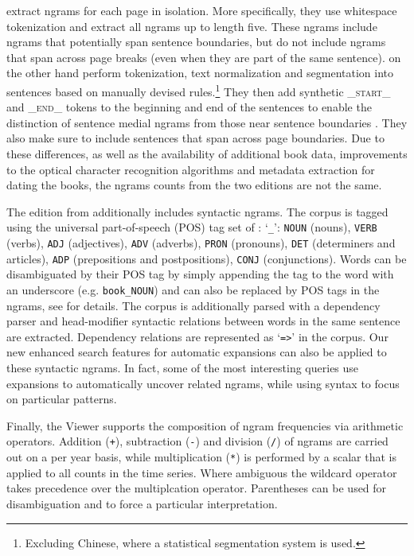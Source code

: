 \documentclass[11pt,a4paper]{article}
\newcommand{\query}[1]{\texttt{#1}}
\begin{document}
 extract ngrams for each page in isolation. More specifically, they use whitespace tokenization and extract all ngrams up to length five. These ngrams include ngrams that potentially span sentence boundaries, but do not include ngrams that span across page breaks (even when they are part of the same sentence).
 on the other hand perform tokenization, text normalization and segmentation into sentences based on manually devised rules.\footnote{Excluding Chinese, where a statistical segmentation system is used.} They then add synthetic \textsf{\textsc{\_start\_}} and \textsf{\textsc{\_end\_}} tokens to the beginning and end of the sentences to enable the distinction of sentence medial ngrams from those near sentence boundaries \cite{lin2012syntactic}. They also make sure to include sentences that span across page boundaries. Due to these differences, as well as the availability of additional book data, improvements to the optical character recognition algorithms and metadata extraction for dating the books, the ngrams counts from the two editions are not the same.

The edition from  additionally includes syntactic ngrams. The corpus is tagged using the universal part-of-speech (POS) tag set of : `\query{\_}': \query{NOUN} (nouns), \query{VERB} (verbs), \query{ADJ} (adjectives), \query{ADV} (adverbs), \query{PRON} (pronouns), \query{DET} (determiners and articles), \query{ADP} (prepositions and postpositions), \query{CONJ} (conjunctions). Words can be disambiguated by their POS tag by simply appending the tag to the word with an underscore (e.g. \texttt{book\_NOUN}) and can also be replaced by POS tags in the ngrams, see  for details. The corpus is additionally parsed with a dependency parser and head-modifier syntactic relations between words in the same sentence are extracted. Dependency relations are represented as `\query{=>}' in the corpus. Our new enhanced search features for automatic expansions can also be applied to these syntactic ngrams. In fact, some of the most interesting queries use expansions to automatically uncover related ngrams, while using syntax to focus on particular patterns.

Finally, the Viewer supports the composition of ngram frequencies via arithmetic operators. Addition (\query{+}), subtraction (\query{-}) and division (\query{/}) of ngrams are carried out on a per year basis, while multiplication (\query{*}) is performed by a scalar that is applied to all counts in the time series. Where ambiguous the wildcard operator takes precedence over the multiplcation operator. Parentheses can be used for disambiguation and to force a particular interpretation.
\end{document}
